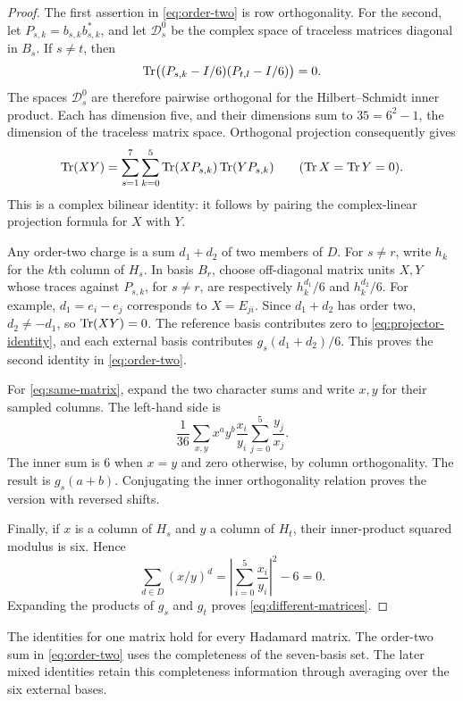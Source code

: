 \begin{proof}
The first assertion in \eqref{eq:order-two} is row orthogonality.
For the second, let
\(P_{s,k}=b_{s,k}b_{s,k}^*\), and let \(\mathcal D_s^0\) be the complex
space of traceless matrices diagonal in \(B_s\). If \(s\ne t\), then
\[
 \operatorname{Tr}\bigl((P_{s,k}-I/6)(P_{t,l}-I/6)\bigr)=0.
\]
The spaces \(\mathcal D_s^0\) are therefore pairwise orthogonal for the
Hilbert--Schmidt inner product. Each has dimension five, and their
dimensions sum to \(35=6^2-1\), the dimension of the traceless matrix
space. Orthogonal projection consequently gives
\begin{equation}\label{eq:projector-identity}
 \operatorname{Tr}(XY)=\sum_{s=1}^7\sum_{k=0}^5
       \operatorname{Tr}(XP_{s,k})\operatorname{Tr}(YP_{s,k})
 \qquad(\operatorname{Tr} X=\operatorname{Tr} Y=0).
\end{equation}
This is a complex bilinear identity: it follows by pairing the
complex-linear projection formula for \(X\) with \(Y\).

Any order-two charge is a sum \(d_1+d_2\) of two members of \(D\).
For \(s\ne r\), write \(h_k\) for the \(k\)th column of \(H_s\).
In basis \(B_r\), choose off-diagonal matrix units \(X,Y\) whose traces
against \(P_{s,k}\), for \(s\ne r\), are respectively
\(h_k^{d_1}/6\) and \(h_k^{d_2}/6\). For example,
\(d_1=e_i-e_j\) corresponds to \(X=E_{ji}\).
Since \(d_1+d_2\) has order two, \(d_2\ne-d_1\), so
\(\operatorname{Tr}(XY)=0\). The reference basis contributes zero to
\eqref{eq:projector-identity}, and each external basis contributes
\(g_s(d_1+d_2)/6\). This proves the second identity in
\eqref{eq:order-two}.

For \eqref{eq:same-matrix}, expand the two character sums and write
\(x,y\) for their sampled columns. The left-hand side is
\[
 \frac1{36}\sum_{x,y}x^ay^b\frac{x_i}{y_i}
                 \sum_{j=0}^5\frac{y_j}{x_j}.
\]
The inner sum is \(6\) when \(x=y\) and zero otherwise, by column
orthogonality. The result is \(g_s(a+b)\). Conjugating the inner
orthogonality relation proves the version with reversed shifts.

Finally, if \(x\) is a column of \(H_s\) and \(y\) a column of \(H_t\),
their inner-product squared modulus is six. Hence
\[
 \sum_{d\in D}(x/y)^d
 =\left|\sum_{i=0}^5\frac{x_i}{y_i}\right|^2-6=0.
\]
Expanding the products of \(g_s\) and \(g_t\) proves
\eqref{eq:different-matrices}.
\end{proof}

The identities for one matrix hold for every Hadamard matrix.
The order-two sum in \eqref{eq:order-two} uses the completeness of the
seven-basis set. The later mixed identities retain this completeness
information through averaging over the six external bases.

